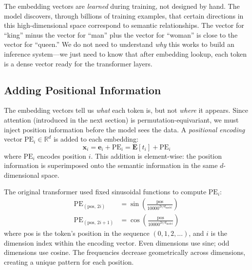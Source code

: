 \begin{insightbox}
The embedding vectors are \emph{learned} during training, not designed by hand. The model discovers, through billions of training examples, that certain directions in this high-dimensional space correspond to semantic relationships. The vector for ``king'' minus the vector for ``man'' plus the vector for ``woman'' is close to the vector for ``queen.'' We do not need to understand \emph{why} this works to build an inference system---we just need to know that after embedding lookup, each token is a dense vector ready for the transformer layers.
\end{insightbox}

\subsection{Adding Positional Information}

The embedding vectors tell us \emph{what} each token is, but not \emph{where} it appears. Since attention (introduced in the next section) is permutation-equivariant, we must inject position information before the model sees the data. A \emph{positional encoding} vector $\text{PE}_i \in \mathbb{R}^d$ is added to each embedding:
\begin{equation}
\mathbf{x}_i = \mathbf{e}_i + \text{PE}_i = \mathbf{E}[t_i] + \text{PE}_i
\end{equation}
where $\text{PE}_i$ encodes position $i$. This addition is element-wise: the position information is superimposed onto the semantic information in the same $d$-dimensional space.

The original transformer used fixed sinusoidal functions to compute $\text{PE}_i$:
\begin{align}
\text{PE}_{(\text{pos},\, 2i)} &= \sin\!\left(\frac{\text{pos}}{10000^{2i/d_{\text{model}}}}\right) \\
\text{PE}_{(\text{pos},\, 2i+1)} &= \cos\!\left(\frac{\text{pos}}{10000^{2i/d_{\text{model}}}}\right)
\end{align}
where pos is the token's position in the sequence $(0, 1, 2, \ldots)$, and $i$ is the dimension index within the encoding vector. Even dimensions use sine; odd dimensions use cosine. The frequencies decrease geometrically across dimensions, creating a unique pattern for each position.

